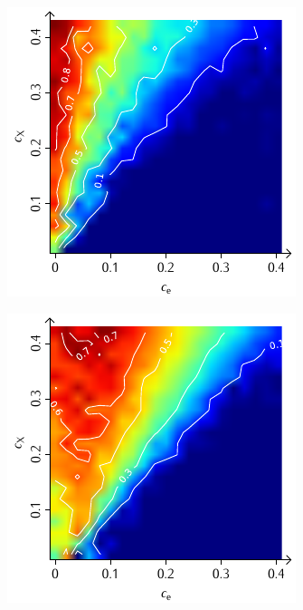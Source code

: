 \documentclass[a4paper, 10pt, twoside, openany]{book} %
\begin{document}
\begin{figure}
\begin{minipage}[t]{0.48\textwidth}
        \includegraphics[width=\textwidth]{Abbildungen/Phasendiagramme/Konturen/F_penalty_cluster_K.pdf}
        \label{F_penalty_cluster_K}
    \end{minipage}
    \begin{minipage}[t]{0.48\textwidth}
        \includegraphics[width=\textwidth]{Abbildungen/Phasendiagramme/Konturen/F_random_K.pdf}

\end{minipage}
\end{figure}
\end{document}
